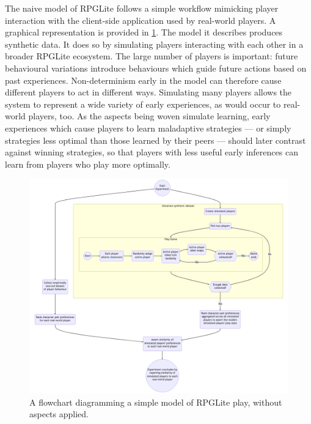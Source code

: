 The naive model of RPGLite follows a simple workflow mimicking player
interaction with the client-side application used by real-world players.
A graphical representation is provided in \cref{fig:naive_model}. 
 The model it describes produces synthetic data.
It does so by simulating players interacting with each other in a broader
RPGLite ecosystem. The large number of players is important: future behavioural
variations introduce behaviours which guide future actions based on past
experiences. Non-determinism early in the model can therefore cause different
players to act in different ways. Simulating many players allows the system to
represent a wide variety of early experiences, as would occur to real-world
players, too. As the aspects being woven simulate learning, early experiences
which cause players to learn maladaptive strategies --- or simply strategies
less optimal than those learned by their peers --- should later contrast against
winning strategies, so that players with less useful early inferences can learn
from players who play more optimally.

\begin{figure}
  \centering
  \includegraphics[width=\columnwidth]{50_optimisation_with_aspects/diagrams/naive_model.png}
  \caption{A flowchart diagramming a simple model of RPGLite play, without
  aspects applied.}
  \label{fig:naive_model}
\end{figure}


